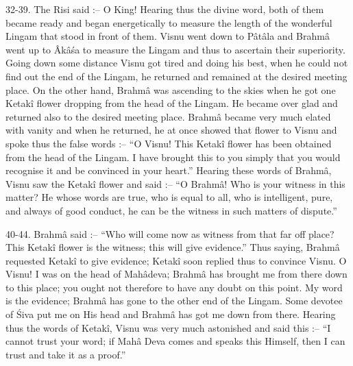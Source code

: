 32-39. The Risi said :-- O King! Hearing thus the divine word, both of them became ready and began energetically to measure the length of the wonderful Lingam that stood in front of them. Visnu went down to P\^at\^ala and Brahm\^a went up to \^Ak\^a\'sa to measure the Lingam and thus to ascertain their superiority. Going down some distance Visnu got tired and doing his best, when he could not find out the end of the Lingam, he returned and remained at the desired meeting place. On the other hand, Brahm\^a was ascending to the skies when he got one Ketak\^i flower dropping from the head of the Lingam. He became over glad and returned also to the desired meeting place. Brahm\^a became very much elated with vanity and when he returned, he at once showed that flower to Visnu and spoke thus the false words :-- ``O Visnu! This Ketak\^i flower has been obtained from the head of the Lingam. I have brought this to you simply that you would recognise it and be convinced in your heart.'' Hearing these words of Brahm\^a, Visnu saw the Ketak\^i flower and said :-- ``O Brahm\^a! Who is your witness in this matter? He whose words are true, who is equal to all, who is intelligent, pure, and always of good conduct, he can be the witness in such matters of dispute.''

40-44. Brahm\^a said :-- ``Who will come now as witness from that far off place? This Ketak\^i flower is the witness; this will give evidence.'' Thus saying, Brahm\^a requested Ketak\^i to give evidence; Ketak\^i soon replied thus to convince Visnu. O Visnu! I was on the head of Mah\^adeva; Brahm\^a has brought me from there down to this place; you ought not therefore to have any doubt on this point. My word is the evidence; Brahm\^a has gone to the other end of the Lingam. Some devotee of \'Siva put me on His head and Brahm\^a has got me down from there. Hearing thus the words of Ketak\^i, Visnu was very much astonished and said this :-- ``I cannot trust your word; if Mah\^a Deva comes and speaks this Himself, then I can trust and take it as a proof.''

